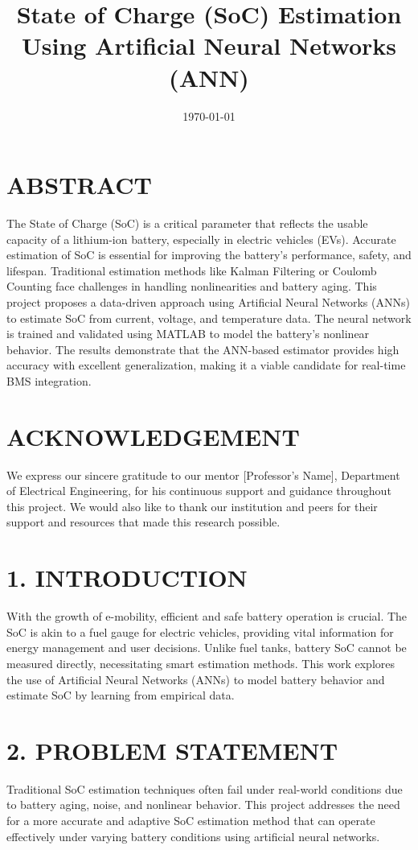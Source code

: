 \documentclass[12pt]{article}
\title{\textbf{State of Charge (SoC) Estimation Using Artificial Neural Networks (ANN)}}
\author{}
\date{\today}
\begin{document}
\maketitle

\section*{ABSTRACT}
The State of Charge (SoC) is a critical parameter that reflects the usable capacity of a lithium-ion battery, especially in electric vehicles (EVs). Accurate estimation of SoC is essential for improving the battery's performance, safety, and lifespan. Traditional estimation methods like Kalman Filtering or Coulomb Counting face challenges in handling nonlinearities and battery aging. This project proposes a data-driven approach using Artificial Neural Networks (ANNs) to estimate SoC from current, voltage, and temperature data. The neural network is trained and validated using MATLAB to model the battery's nonlinear behavior. The results demonstrate that the ANN-based estimator provides high accuracy with excellent generalization, making it a viable candidate for real-time BMS integration.

\section*{ACKNOWLEDGEMENT}
We express our sincere gratitude to our mentor [Professor’s Name], Department of Electrical Engineering, for his continuous support and guidance throughout this project. We would also like to thank our institution and peers for their support and resources that made this research possible.

\section*{1. INTRODUCTION}
With the growth of e-mobility, efficient and safe battery operation is crucial. The SoC is akin to a fuel gauge for electric vehicles, providing vital information for energy management and user decisions. Unlike fuel tanks, battery SoC cannot be measured directly, necessitating smart estimation methods. This work explores the use of Artificial Neural Networks (ANNs) to model battery behavior and estimate SoC by learning from empirical data.

\section*{2. PROBLEM STATEMENT}
Traditional SoC estimation techniques often fail under real-world conditions due to battery aging, noise, and nonlinear behavior. This project addresses the need for a more accurate and adaptive SoC estimation method that can operate effectively under varying battery conditions using artificial neural networks.
\end{document}
